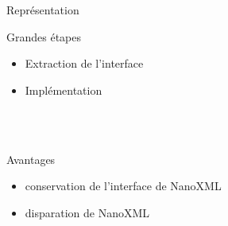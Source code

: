 \begin{frame}
\begin{minipage}[c]{.3\linewidth}
\begin{beamerboxesrounded}[shadow=true]{Représentation}
\end{beamerboxesrounded}
\end{minipage}
\hfill
\begin{minipage}[c]{.6\linewidth}
\begin{minipage}[c]{\linewidth}
\begin{beamerboxesrounded}[shadow=true]{Grandes étapes}
\begin{itemize}
	\item Extraction de l'interface
	\item Implémentation
\end{itemize}
\end{beamerboxesrounded}
\end{minipage}
~\\
~\\
\begin{minipage}[c]{\linewidth}
\begin{beamerboxesrounded}[shadow=true]{Avantages}
\begin{itemize}
	\item conservation de l'interface de NanoXML
	\item disparation de NanoXML
\end{itemize}
\end{beamerboxesrounded}
\end{minipage}
\end{minipage}
\end{frame}
